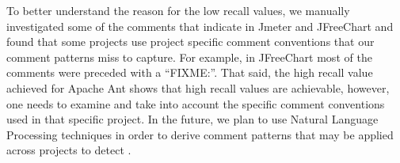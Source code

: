 To better understand the reason for the low recall values, we manually investigated some of the comments that indicate \SADTD in Jmeter and JFreeChart and found that some projects use project specific comment conventions that our comment patterns miss to capture. For example, in JFreeChart most of the \SADTD comments were preceded with a ``FIXME:''. That said, the high recall value achieved for Apache Ant shows that high recall values are achievable, however, one needs to examine and take into account the specific comment conventions used in that specific project. In the future, we plan to use Natural Language Processing techniques in order to derive comment patterns that may be applied across projects to detect \SADTD.




